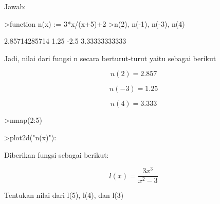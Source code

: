 \documentclass{article}
\begin{document}
\begin{eulernotebook}
\begin{eulercomment}
Jawab:
\end{eulercomment}
\begin{eulerprompt}
>function n(x) := 3*x/(x+5)+2
>n(2), n(-1), n(-3), n(4)
\end{eulerprompt}
\begin{euleroutput}
  2.85714285714
  1.25
  -2.5
  3.33333333333
\end{euleroutput}
\begin{eulercomment}
Jadi, nilai dari fungsi n secara berturut-turut yaitu sebagai berikut\\
\end{eulercomment}
\begin{eulerformula}
\[
n(2) = 2.857
\]
\end{eulerformula}
\begin{eulerformula}
\[
n(-3) = 1.25
\]
\end{eulerformula}
\begin{eulerformula}
\[
n(4) = 3.333
\]
\end{eulerformula}
\begin{eulerprompt}
>nmap(2:5)
\end{eulerprompt}
\begin{euleroutput}
  [2.85714,  3.125,  3.33333,  3.5]
\end{euleroutput}
\begin{eulerprompt}
>plot2d("n(x)"):
\end{eulerprompt}
\begin{eulercomment}
\end{eulercomment}
\eulersubheading{}
\begin{eulercomment}
Diberikan fungsi sebagai berikut:

\end{eulercomment}
\begin{eulerformula}
\[
l(x)=\frac {3x^3}{x^2-3}
\]
\end{eulerformula}
\begin{eulercomment}
Tentukan nilai dari l(5), l(4), dan l(3)


\end{eulercomment}
\end{eulernotebook}
\end{document}
